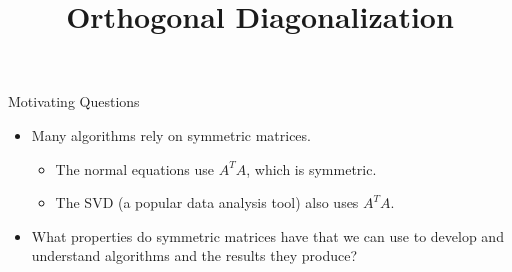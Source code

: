 \title{Orthogonal Diagonalization}
\subtitle{\SubTitleName}
\institute[]{\Course}
\author{\Instructor}
\maketitle   
  




\begin{frame}{Motivating Questions}

    \begin{itemize}\setlength{\itemsep}{8pt}
        \item<1-> Many algorithms rely on symmetric matrices. \vspace{8pt}
        \begin{itemize}\setlength{\itemsep}{8pt}
            \item <1-> {\normalsize The normal equations use $A^TA$, which is symmetric. }
            \item <2-> {\normalsize The SVD (a popular data analysis tool) also uses $A^TA$.}
        \end{itemize}
        \item<3-> What properties do symmetric matrices have that we can use to develop and understand algorithms and the results they produce? 
    \end{itemize}

\end{frame}

